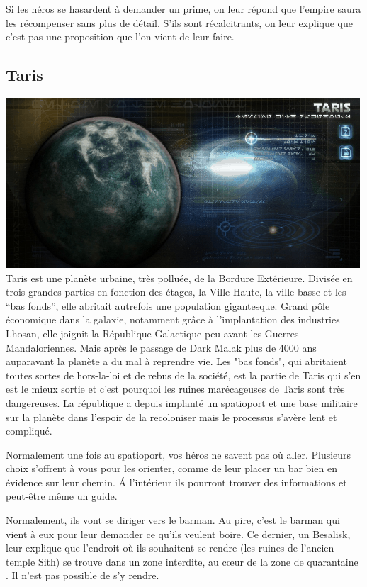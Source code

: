 Si les héros se hasardent à demander un prime, on leur répond que l’empire saura les récompenser sans plus de détail. S’ils sont récalcitrants, on leur explique que c’est pas une proposition que l’on vient de leur faire.


\subsection{Taris} \label{sec:taris}
\noindent\includegraphics[width=\linewidth]{_img/places/taris.png}
Taris est une planète urbaine, très polluée, de la Bordure Extérieure. Divisée en trois grandes parties en fonction des étages, la Ville Haute, la ville basse et les “bas fonds”, elle abritait autrefois une population gigantesque. Grand pôle économique dans la galaxie, notamment grâce à l’implantation des industries Lhosan, elle joignit la République Galactique peu avant les Guerres Mandaloriennes. Mais après le passage de Dark Malak plus de 4000 ans auparavant la planète a du mal à reprendre vie. Les "bas fonds", qui abritaient toutes sortes de hors-la-loi et de rebus de la société, est la partie de Taris qui s’en est le mieux sortie et c’est pourquoi les ruines marécageuses de Taris sont très dangereuses. La république a depuis implanté un spatioport et une base militaire sur la planète dans l’espoir de la recoloniser mais le processus s’avère lent et compliqué.

Normalement une fois au spatioport, vos héros ne savent pas où aller. Plusieurs choix s’offrent à vous pour les orienter, comme de leur placer un bar bien en évidence sur leur chemin. \'A l’intérieur ils pourront trouver des informations et peut-être même un guide.

Normalement, ils vont se diriger vers le barman. Au pire, c’est le barman qui vient à eux pour leur demander ce qu’ils veulent boire. Ce dernier, un Besalisk, leur explique que l’endroit où ils souhaitent se rendre (les ruines de l’ancien temple Sith) se trouve dans un zone interdite, au c\oe{ur} de la zone de quarantaine . Il n’est pas possible de s’y rendre.

